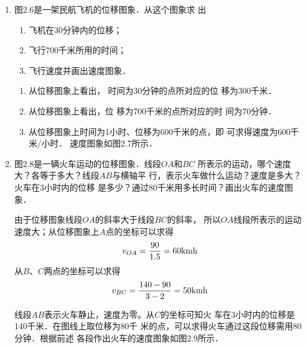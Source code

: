 \begin{enumerate}
    \item 图2.6是一架民航飞机的位移图象．从这个图象求
    出
    \begin{enumerate}
        \item 飞机在30分钟内的位移；
        \item 飞行700千米所用的时间；
        \item 飞行速度并画出速度图象．
    \end{enumerate}

\begin{solution}
\begin{enumerate}
    \item 从位移图象上看出，
    时间为30分钟的点所对应的位
    移为300千米．
    \item 从位移图象上看出，位
    移为700千米的点所对应的时
    间为70分钟．
    \item 从位移图象上时间为1小时、位移为600千米的点，即
    可求得速度为600千米/小时．
    速度图象如图2.7所示．
\end{enumerate}
\end{solution}

\item  图2.8是一辆火车运动的位移图象．线段$OA$和$BC$
所表示的运动，哪个速度大？各等于多大？线段$AB$与横轴平
行，表示火车做什么运动？速度是多大？火车在3小时内的位移
是多少？通过80千米用多长时间？画出火车的速度图象．

\begin{solution}
    由于位移图象线段$OA$的斜率大于线段$BC$的斜率，
    所以$OA$线段所表示的运动速度大；从位移图象上$A$点的坐标可以求得
\[v_{OA}=\frac{90}{1.5}=60{\rm kmh}\]
从$B$、$C$两点的坐标可以求得
\[v_{BC}=\frac{140-90}{3-2}=50{\rm kmh}\]

    线段$AB$表示火车静止，速度为零。从$C$的坐标可知火
    车在3小时内的位移是140千米．在图线上取位移为80千
    米的点，可以求得火车通过这段位移需用80分钟．根据前述
    各段作出火车的速度图象如图2.9所示．
\end{solution}

\begin{figure}[htp]\centering
    \begin{minipage}[t]{0.48\textwidth}
    \centering
{}
\end{minipage}
\end{figure}
\end{enumerate}
